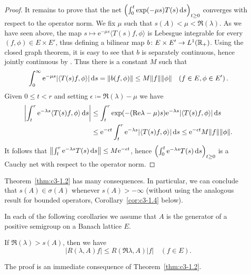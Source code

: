 \begin{proof}
It remains to prove that the net $\left(\int_{0}^t \exp(-\mu s)T(s) \mathop{}\!\mathrm{d}{s} \right)_{t\geq 0}$ converges with respect to the operator norm.
We fix $\mu$ such that $s(A) < \mu < \Re(\lambda)$.
As we have seen above, the map $s \mapsto \mathrm{e}^{-\mu s}\langle T(s)f,\phi\rangle$ is Lebesgue integrable for every $(f,\phi) \in E \times E'$, thus defining a bilinear map $b \colon E \times E' \to L^1(\mathbb{R} _{+})$.
Using the closed graph theorem, it is easy to see that $b$ is separately continuous, hence jointly continuous by \citet[III.Theorem~5.1]{schaefer:1966}.
Thus there is a constant $M$ such that
\begin{equation}\label{eq:c3-1.4}
	\int_{0}^{\infty} \mathrm{e}^{-\mu s}|\langle T(s)f,\phi\rangle| \mathop{}\!\mathrm{d}{s}  = \|b(f,\phi)\| \leq M\|f\|\|\phi\| \quad (f \in E, \phi \in E')\,.
\end{equation}
Given $0 \leq t < r$ and setting $\epsilon \coloneqq \Re(\lambda) - \mu$ we have
\begin{align*}
	\left|\int_{t}^r \mathrm{e}^{-\lambda s}\langle T(s)f,\phi\rangle \mathop{}\!\mathrm{d}{s} \right| &\leq \int_{t}^r \exp(-(\mathop{}\!\mathrm{Re} \lambda-\mu)s)\mathrm{e}^{-\lambda s}|\langle T(s)f,\phi\rangle| \mathop{}\!\mathrm{d}{s}  \\
	&\leq \mathrm{e}^{-\epsilon t}\int_{t}^r \mathrm{e}^{-\lambda s}|\langle T(s)f,\phi\rangle| \mathop{}\!\mathrm{d}{s}  \leq \mathrm{e}^{-\epsilon t} M\|f\|\|\phi\|.
\end{align*}
It follows that $\left\|\int_{t}^r \mathrm{e}^{-\lambda s}T(s) \mathop{}\!\mathrm{d}{s} \right\| \leq M\mathrm{e}^{-\epsilon t}$, hence $\left(\int_{0}^t \mathrm{e}^{-\lambda s}T(s) \mathop{}\!\mathrm{d}{s} \right)_{t\geq 0}$ is a Cauchy net with respect to the operator norm.
\end{proof}
Theorem~\ref{thm:c3-1.2} has many consequences.
In particular, we can conclude that $s(A) \in \sigma(A)$ whenever $s(A) > -\infty$ (without using the analogous result for bounded operators, \cf Corollary~\ref{cor:c3-1.4} below).

In each of the following corollaries we assume that $A$ is the generator of a positive semigroup on a Banach lattice $E$.

\begin{corollary}\label{cor:c3-1.3}
If $\Re(\lambda) > s(A)$, then we have
\begin{equation}\label{eq:c3-1.5}
	|R(\lambda,A)f| \leq R(\Re \lambda,A) |f| \quad (f \in E).
\end{equation}
\end{corollary}
The proof is an immediate consequence of Theorem~\ref{thm:c3-1.2}.

